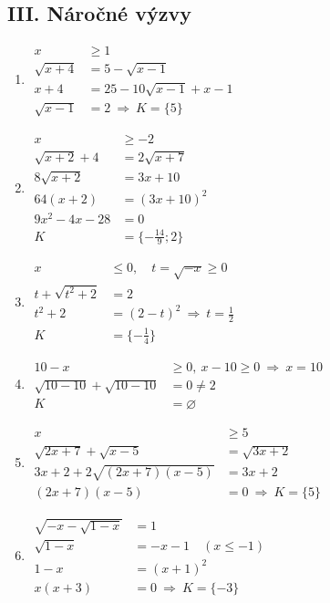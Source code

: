 \documentclass[11pt,a4paper]{article}
\begin{document}
\subsection*{III. Náročné výzvy}
\begin{enumerate}[label={},itemsep=9pt]
\item[\textbf{F003}] \(\displaystyle \begin{aligned}x&\ge1\\\sqrt{x+4}&=5-\sqrt{x-1}\\x+4&=25-10\sqrt{x-1}+x-1\\\sqrt{x-1}&=2\ \Rightarrow\ K=\{5\}\end{aligned}\)\par
\item[\textbf{F004}] \(\displaystyle \begin{aligned}x&\ge-2\\\sqrt{x+2}+4&=2\sqrt{x+7}\\8\sqrt{x+2}&=3x+10\\64(x+2)&=(3x+10)^2\\9x^2-4x-28&=0\\K&=\{-\tfrac{14}{9};2\}\end{aligned}\)\par
\item[\textbf{F005}] \(\displaystyle \begin{aligned}x&\le0,\quad t=\sqrt{-x}\ge0\\t+\sqrt{t^2+2}&=2\\t^2+2&=(2-t)^2\ \Rightarrow\ t=\tfrac12\\K&=\{-\tfrac14\}\end{aligned}\)\par
\item[\textbf{F006}] \(\displaystyle \begin{aligned}10-x&\ge0,\ x-10\ge0\ \Rightarrow\ x=10\\\sqrt{10-10}+\sqrt{10-10}&=0\ne2\\K&=\varnothing\end{aligned}\)\par
\item[\textbf{F007}] \(\displaystyle \begin{aligned}x&\ge5\\\sqrt{2x+7}+\sqrt{x-5}&=\sqrt{3x+2}\\3x+2+2\sqrt{(2x+7)(x-5)}&=3x+2\\(2x+7)(x-5)&=0\ \Rightarrow\ K=\{5\}\end{aligned}\)\par
\item[\textbf{F008}] \(\displaystyle \begin{aligned}\sqrt{-x-\sqrt{1-x}}&=1\\\sqrt{1-x}&=-x-1\quad (x\le-1)\\1-x&=(x+1)^2\\x(x+3)&=0\ \Rightarrow\ K=\{-3\}\end{aligned}\)\par

\end{enumerate}
\end{document}
